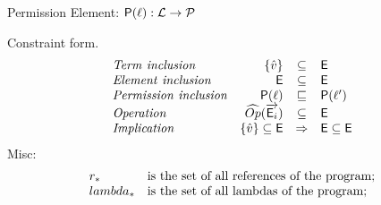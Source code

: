 Permission Element: $\mathsf{P}(\ell) : {\mathcal L} \rightarrow \mathcal{P} $


Constraint form.
\[
\begin{array}{lrcl}
\mathit{Term\ inclusion} & \{\hat{v}\} & \subseteq & \mathsf{E} \\
\mathit{Element\ inclusion} & \mathsf{E} & \subseteq & \mathsf{E} \\
\mathit{Permission\ inclusion} & \mathsf{P}(\ell) & \sqsubseteq & \mathsf{P}(\ell') \\
\mathit{Operation} & \widehat{Op}(\overrightarrow{\mathsf{E}_i}) & \subseteq & \mathsf{E} \\
\mathit{Implication} & \{\hat{v}\} \subseteq \mathsf{E} & \Rightarrow & \mathsf{E} \subseteq \mathsf{E} \\
\end{array}
\]
Misc:
\[
\begin{array}{l l}
r_* & $is the set of all references of the program;$\\
lambda_* & $is the set of all lambdas of the program;$\\
\end{array}
\]

